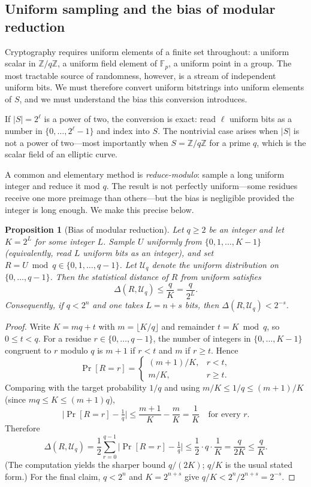 \documentclass[11pt,a4paper]{article}
\newtheorem{proposition}[theorem]{Proposition}
\theoremstyle{definition}
\theoremstyle{remark}
\newcommand{\Z}{\ensuremath{\mathbb{Z}}}
\newcommand{\Fp}{\ensuremath{\mathbb{F}_{p}}}
\begin{document}
\subsection{Uniform sampling and the bias of modular reduction}

Cryptography requires uniform elements of a finite set throughout: a uniform scalar in \(\Z/q\Z\), a uniform field element of \(\Fp\), a uniform point in a group. The most tractable source of randomness, however, is a stream of independent uniform bits. We must therefore convert uniform bitstrings into uniform elements of \(S\), and we must understand the bias this conversion introduces.

If \(|S| = 2^\ell\) is a power of two, the conversion is exact: read \(\ell\) uniform bits as a number in \(\{0, \dots, 2^\ell - 1\}\) and index into \(S\). The nontrivial case arises when \(|S|\) is not a power of two---most importantly when \(S = \Z/q\Z\) for a prime \(q\), which is the scalar field of an elliptic curve.

A common and elementary method is \emph{reduce-modulo}: sample a long uniform integer and reduce it mod \(q\). The result is not perfectly uniform---some residues receive one more preimage than others---but the bias is negligible provided the integer is long enough. We make this precise below.

\begin{proposition}[Bias of modular reduction]\label{probability:prop-modbias}
Let \(q \ge 2\) be an integer and let \(K = 2^L\) for some integer \(L\). Sample \(U\) uniformly from \(\{0, 1, \dots, K-1\}\) (equivalently, read \(L\) uniform bits as an integer), and set \(R = U \bmod q \in \{0, 1, \dots, q-1\}\). Let \(\mathcal{U}_q\) denote the uniform distribution on \(\{0,\dots,q-1\}\). Then the statistical distance of \(R\) from uniform satisfies
\[
\Delta(R, \mathcal{U}_q) \le \frac{q}{K} = \frac{q}{2^{L}}.
\]
Consequently, if \(q < 2^n\) and one takes \(L = n + s\) bits, then \(\Delta(R, \mathcal{U}_q) < 2^{-s}\).
\end{proposition}

\begin{proof}
Write \(K = mq + t\) with \(m = \lfloor K/q\rfloor\) and remainder \(t = K \bmod q\), so \(0 \le t < q\). For a residue \(r \in \{0,\dots,q-1\}\), the number of integers in \(\{0,\dots,K-1\}\) congruent to \(r\) modulo \(q\) is \(m+1\) if \(r < t\) and \(m\) if \(r \ge t\). Hence
\[
\Pr[R = r] = \begin{cases} (m+1)/K, & r < t,\\[2pt] m/K, & r \ge t. \end{cases}
\]
Comparing with the target probability \(1/q\) and using \(m/K \le 1/q \le (m+1)/K\) (since \(mq \le K \le (m+1)q\)),
\[
\Big|\Pr[R=r] - \tfrac1q\Big| \le \frac{m+1}{K} - \frac{m}{K} = \frac1K \quad\text{for every } r.
\]
Therefore
\[
\Delta(R, \mathcal{U}_q) = \frac12\sum_{r=0}^{q-1}\Big|\Pr[R=r] - \tfrac1q\Big| \le \frac12 \cdot q \cdot \frac1K = \frac{q}{2K} \le \frac{q}{K}.
\]
(The computation yields the sharper bound \(q/(2K)\); \(q/K\) is the usual stated form.) For the final claim, \(q < 2^n\) and \(K = 2^{n+s}\) give \(q/K < 2^n/2^{n+s} = 2^{-s}\).
\end{proof}
\end{document}
